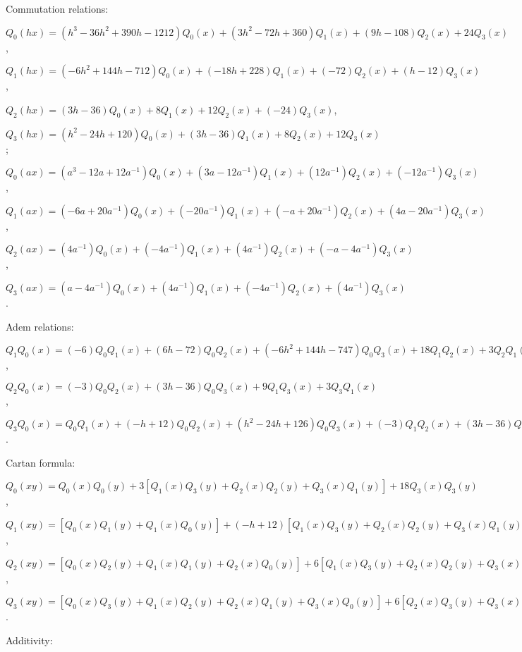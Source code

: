 \documentclass[12pt]{article}
\theoremstyle{definition}
\theoremstyle{remark}
\begin{document}
Commutation relations: 

$Q_0(h x) = (h^3 - 36 h^2 + 390 h - 1212) Q_0(x) + (3 h^2 - 72 h + 360) Q_1(x) + (9 h - 108) Q_2(x) + 24 Q_3(x)$, 

$Q_1(h x) = (-6 h^2 + 144 h - 712) Q_0(x) + (-18 h + 228) Q_1(x) + (-72) Q_2(x) + (h - 12) Q_3(x)$, 

$Q_2(h x) = (3 h - 36) Q_0(x) + 8 Q_1(x) + 12 Q_2(x) + (-24) Q_3(x)$, 

$Q_3(h x) = (h^2 - 24 h + 120) Q_0(x) + (3 h - 36) Q_1(x) + 8 Q_2(x) + 12 Q_3(x)$; 

$Q_0(a x) = (a^3 - 12 a + 12 a^{-1}) Q_0(x) + (3 a - 12 a^{-1}) Q_1(x) + (12 a^{-1}) Q_2(x) + (-12 a^{-1}) Q_3(x)$, 

$Q_1(a x) = (-6 a + 20 a^{-1}) Q_0(x) + (-20 a^{-1}) Q_1(x) + (- a + 20 a^{-1}) Q_2(x) + (4 a - 20 a^{-1}) Q_3(x)$, 

$Q_2(a x) = (4 a^{-1}) Q_0(x) + (-4 a^{-1}) Q_1(x) + (4 a^{-1}) Q_2(x) + (- a - 4 a^{-1}) Q_3(x)$, 

$Q_3(a x) = (a - 4 a^{-1}) Q_0(x) + (4 a^{-1}) Q_1(x) + (-4 a^{-1}) Q_2(x) + (4 a^{-1}) Q_3(x)$.  

Adem relations: 

$Q_1Q_0(x) = (-6) Q_0Q_1(x) + (6 h - 72) Q_0Q_2(x) + (-6 h^2 + 144 h - 747) Q_0Q_3(x) + 18 Q_1Q_2(x) + 3 Q_2Q_1(x) + (-18 h + 216) Q_1Q_3(x) + (-54) Q_2Q_3(x) + (-9) Q_3Q_2(x)$, 

$Q_2Q_0(x) = (-3) Q_0Q_2(x) + (3 h - 36) Q_0Q_3(x) + 9 Q_1Q_3(x) + 3 Q_3Q_1(x)$, 

$Q_3Q_0(x) = Q_0Q_1(x) + (-h + 12) Q_0Q_2(x) + (h^2 - 24 h + 126) Q_0Q_3(x) + (-3) Q_1Q_2(x) + (3 h - 36) Q_1Q_3(x) + 9 Q_2Q_3(x)$.  

Cartan formula: 

$Q_0(xy) = Q_0(x) Q_0(y) + 3 [Q_1(x) Q_3(y) + Q_2(x) Q_2(y) + Q_3(x) Q_1(y)] + 18 Q_3(x) Q_3(y)$, 

$Q_1(xy) = [Q_0(x) Q_1(y) + Q_1(x) Q_0(y)] + (-h + 12) [Q_1(x) Q_3(y) + Q_2(x) Q_2(y) + Q_3(x) Q_1(y)] + 3 [Q_2(x) Q_3(y) + Q_3(x) Q_2(y)] + (-6h + 72) Q_3(x) Q_3(y)$, 

$Q_2(xy) = [Q_0(x) Q_2(y) + Q_1(x) Q_1(y) + Q_2(x) Q_0(y)] + 6 [Q_1(x) Q_3(y) + Q_2(x) Q_2(y) + Q_3(x) Q_1(y)] + (-h + 12) [Q_2(x) Q_3(y) + Q_3(x) Q_2(y)] + 39 Q_3(x) Q_3(y)$, 

$Q_3(xy) = [Q_0(x) Q_3(y) + Q_1(x) Q_2(y) + Q_2(x) Q_1(y) + Q_3(x) Q_0(y)] + 6 [Q_2(x) Q_3(y) + Q_3(x) Q_2(y)] + (-h + 12) Q_3(x) Q_3(y)$.  

Additivity: 
\end{document}
